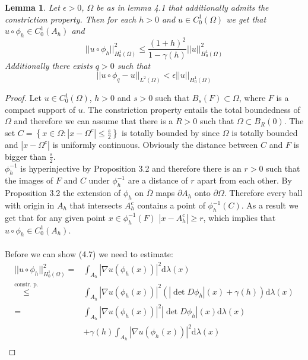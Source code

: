 \documentclass[11pt,a4paper,leqno]{report}
\newtheorem{lemma}[theorem]{Lemma}
\numberwithin{equation}{chapter}
\begin{document}
\begin{lemma} Let $\epsilon>0$, $\Omega$ be as in lemma 4.1 that additionally admits the constriction property. Then for each $h>0$ and $u\in C^1_0(\Omega)$ we get that $u\circ\phi_h\in C^1_0(A_h)$ and \begin{equation} ||u\circ\phi_h||_{H^1_0(\Omega)}^2\leq\frac{(1+h)^2}{1-\gamma(h)}||u||_{H^1_0(\Omega)}^2\end{equation} 
Additionally there exists $q>0$ such that \begin{equation} ||u\circ\phi_q-u||_{L^2(\Omega)}<\epsilon||u||_{H^1_0(\Omega)}\end{equation}
\end{lemma}
\begin{proof}Let $u\in C^1_0(\Omega)$, $h>0$ and $s>0$ such that $B_s(F)\subset\Omega$, where $F$ is a compact support of $u$. The constriction property entails the total boundedness of $\Omega$ and therefore we can assume that there is a $R>0$ such that $\Omega\subset B_R(0)$. The set $C=\left\{x\in\Omega:|x-\Omega^c|\leq\frac{s}{2}\right\}$ is totally bounded by \cite[Theorem 4.9 p.98]{CANA} since $\Omega$ is totally bounded  and $|x-\Omega^c|$ is uniformly continuous. Obviously the distance between $C$ and $F$ is bigger than $\frac{s}{2}$.\\
$\phi_h^{-1}$ is hyperinjective by Proposition 3.2 and therefore there is an $r>0$ such that the images of $F$ and $C$ under $\phi_h^{-1}$ are a distance of $r$ apart from each other. By Proposition 3.2 the extension of $\phi_h$ on $\overline{\Omega}$ maps $\partial A_h$ onto $\partial \Omega$. Therefore every ball with origin in $A_h$ that intersects $A_h^c$ contains a point of $\phi_h^{-1}(C)$. As a result we get that for any given point $x\in\phi_h^{-1}(F)$ $|x-A_h^c|\geq r$, which implies that $u\circ\phi_h\in C^1_0(A_h)$.\\
\\
Before we can show (4.7) we need to estimate:
\begin{align*}||u\circ\phi_h||_{H^1_0(\Omega)}^2=&\int_{A_h}|\nabla u(\phi_h(x))|^2\mathrm{d}\lambda(x)\\
\overset{\text{constr. p.}}{\leq}&\int_{A_h}|\nabla u(\phi_h(x))|^2(|\det D\phi_h|(x)+\gamma(h))\mathrm{d}\lambda(x)\\
=&\int_{A_h}|\nabla u(\phi_h(x))|^2|\det D\phi_h|(x)\mathrm{d}\lambda(x)\\&+\gamma(h)\int_{A_h}|\nabla u(\phi_h(x))|^2\mathrm{d}\lambda(x)\\
\end{align*}

\end{proof}
\end{document}
